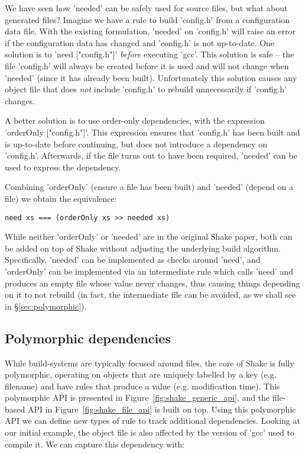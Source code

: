 We have seen how \lst'needed' can be safely used for source files, but what about generated files? Imagine we have a rule to build \lst'config.h' from a configuration data file. With the existing formulation, \lst'needed' on \lst'config.h' will raise an error if the configuration data has changed and \lst'config.h' is not up-to-date. One solution is to \lst'need ["config.h"]' \emph{before} executing \lst'gcc'. This solution is safe -- the file \lst'config.h' will always be created before it is used and will not change when \lst'needed' (since it has already been built). Unfortunately this solution causes any object file that does \emph{not} include \lst'config.h' to rebuild unnecessarily if \lst'config.h' changes.

A better solution is to use order-only dependencies, with the expression \lst'orderOnly ["config.h"]'. This expression ensures that \lst'config.h' has been built and is up-to-date before continuing, but does not introduce a dependency on \lst'config.h'. Afterwards, if the file turns out to have been required, \lst'needed' can be used to express the dependency.

Combining \lst'orderOnly' (ensure a file has been built) and \lst'needed' (depend on a file) we obtain the equivalence:

\begin{lstlisting}
need xs === (orderOnly xs >> needed xs)
\end{lstlisting}

While neither \lst'orderOnly' or \lst'needed' are in the original Shake paper, both can be added on top of Shake without adjusting the underlying build algorithm. Specifically, \lst'needed' can be implemented as checks around \lst'need', and \lst'orderOnly' can be implemented via an intermediate rule which calls \lst'need' and produces an empty file whose value never changes, thus causing things depending on it to not  rebuild (in fact, the intermediate file can be avoided, as we shall see in \S\ref{sec:polymorphic}).

\subsection{Polymorphic dependencies\label{sec:polymorphic}}

While build-systems are typically focused around files, the core of Shake is fully polymorphic, operating on objects that are uniquely labelled by a key (e.g. filename) and have rules that produce a value (e.g. modification time). This polymorphic API is presented in Figure~\ref{fig:shake_generic_api}, and the file-based API in Figure~\ref{fig:shake_file_api} is built on top. Using this polymorphic API we can define new types of rule to track additional dependencies. Looking at our initial example, the object file is also affected by the version of \lst'gcc' used to compile it. We can capture this dependency with:

